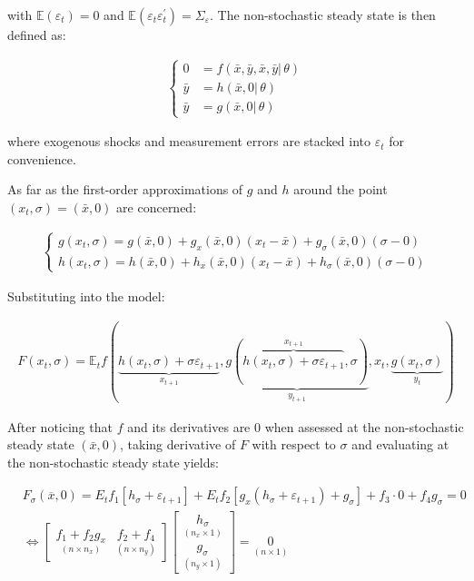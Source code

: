 \documentclass{pracamgr}
\numberwithin{equation}{section}
\begin{document}
with $\mathbb{E}(\varepsilon_{t}) = 0$ and $\mathbb{E}(\varepsilon_{t} \varepsilon_{t}^{'} ) = \Sigma_{\varepsilon}$. The non-stochastic steady state is then defined as:

\begin{align}
\left\{
\begin{array}{cl}
0 &= f \left(\bar{x}, \bar{y}, \bar{x}, \bar{y}| \, \theta \right) \\
\bar{y} &= h \left( \bar{x}, 0 | \, \theta \right) \\
\bar{y} &= g \left( \bar{x}, 0 | \, \theta \right)
\end{array}
\right.
\end{align}

where exogenous shocks and measurement errors are stacked into $\varepsilon_{t}$ for convenience.

As far as the first-order approximations of $g$ and $h$ around the point $(x_{t}, \sigma) = (\bar{x}, 0)$ are concerned:

\begin{align}
\left\{
\begin{array}{cl}
g(x_{t}, \sigma) = g(\bar{x}, 0) + g_{x}(\bar{x}, 0)(x_{t} - \bar{x}) + g_{\sigma}(\bar{x}, 0)(\sigma - 0) \\
h(x_{t}, \sigma) = h(\bar{x}, 0) + h_{x}(\bar{x}, 0)(x_{t} - \bar{x}) + h_{\sigma}(\bar{x}, 0)(\sigma - 0)
\end{array}
\right.
\end{align}

Substituting into the model:

\begin{align}
F(x_{t}, \sigma) = \mathbb{E}_{t} f \left( \underbrace{h(x_{t}, \sigma) + \sigma \varepsilon_{t+1}}_{x_{t+1}}, \underbrace{g \left( \overbrace{h\left(x_{t}, \sigma \right) + \sigma \varepsilon_{t+1}}^{x_{t+1}}, \sigma \right)}_{y_{t+1}}, x_{t}, \underbrace{g(x_{t}, \sigma)}_{y_{t}} \right)
\end{align}

After noticing that $f$ and its derivatives are 0 when assessed at the non-stochastic steady state $\left(\bar{x}, 0\right)$, taking derivative of $F$ with respect to $\sigma$ and evaluating at the non-stochastic steady state yields:

\begin{eqnarray}
&F_\sigma(\overline{x},0) = E_t f_1[h_\sigma + \varepsilon_{t+1}] + E_t f_2 [g_x(h_\sigma+ \varepsilon_{t+1})+g_\sigma] + f_3\cdot 0 + f_4 g_\sigma = 0 \nonumber \\
 &  \iff \begin{bmatrix} \underset{(n \times n_x)}{f_1 + f_2 g_x} & \underset{(n\times n_y)}{f_2 +f_4}\end{bmatrix} \begin{bmatrix} \underset{(n_x \times 1)}{h_\sigma} \\ \underset{(n_y \times 1)}{g_\sigma} \end{bmatrix} = \underset{(n \times 1)}{0}
  \end{eqnarray}
\end{document}
